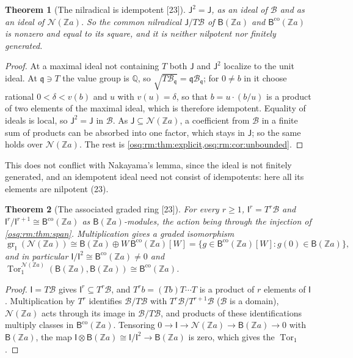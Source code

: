 \documentclass[11pt,letterpaper]{article}
\numberwithin{equation}{section}
\newtheorem{theorem}{Theorem}[section]
\theoremstyle{definition}
\theoremstyle{remark}
\theoremstyle{plain}
\newcommand{\Z}{\mathbb Z}
\newcommand{\Q}{\mathbb Q}
\newcommand{\NN}{\mathcal N}         %
\newcommand{\Tor}{\operatorname{Tor}}
\newcommand{\src}[1]{\textup{\textsf{[#1]}}}
\begin{document}
\begin{theorem}[The nilradical is idempotent \src{23}]\label{osq:rm:thm:nilideal}
$\mathsf J^2=\mathsf J$, as an ideal of $\mathscr B$ and as an ideal of $\NN(\Z a)$. So the common nilradical $\mathsf J/T\mathscr B$ of $\mathsf B(\Z a)$ and
$\mathsf B^{\mathrm{co}}(\Z a)$ is nonzero and equal to its square, and it is neither nilpotent nor finitely generated.
\end{theorem}
\begin{proof}
At a maximal ideal not containing $T$ both $\mathsf J$ and $\mathsf J^2$ localize to the unit ideal. At $\mathfrak q\ni T$ the value group is $\Q$, so
$\sqrt{T\mathscr B_{\mathfrak q}}=\mathfrak q\mathscr B_{\mathfrak q}$; for $0\ne b$ in it choose rational $0<\delta<v(b)$ and $u$ with $v(u)=\delta$, so that $b=u\cdot(b/u)$
is a product of two elements of the maximal ideal, which is therefore idempotent. Equality of ideals is local, so $\mathsf J^2=\mathsf J$ in $\mathscr B$.
As $\mathsf J\subseteq\NN(\Z a)$, a coefficient from $\mathscr B$ in a finite sum of products can be absorbed into one factor, which stays in $\mathsf J$; so the
same holds over $\NN(\Z a)$. The rest is \cref{osq:rm:thm:explicit,osq:rm:cor:unbounded}.
\end{proof}

This does not conflict with Nakayama's lemma, since the ideal is not finitely generated, and an idempotent ideal need not consist of idempotents:
here all its elements are nilpotent (23).

\begin{theorem}[The associated graded ring \src{23}]\label{osq:rm:thm:graded}
For every $r\ge1$, $\mathsf I^r=T^r\mathscr B$ and $\mathsf I^r/\mathsf I^{r+1}\cong\mathsf B^{\mathrm{co}}(\Z a)$ as $\mathsf B(\Z a)$-modules, the action being through the
injection of \cref{osq:rm:thm:span}. Multiplication gives a graded isomorphism
\begin{equation}\label{osq:rm:eq:graded}
 \operatorname{gr}_{\mathsf I}(\NN(\Z a))\cong\mathsf B(\Z a)\oplus W\,\mathsf B^{\mathrm{co}}(\Z a)[W]=\{g\in\mathsf B^{\mathrm{co}}(\Z a)[W]:g(0)\in\mathsf B(\Z a)\},
\end{equation}
and in particular $\mathsf I/\mathsf I^2\cong\mathsf B^{\mathrm{co}}(\Z a)\ne0$ and $\Tor_1^{\NN(\Z a)}(\mathsf B(\Z a),\mathsf B(\Z a))\cong\mathsf B^{\mathrm{co}}(\Z a)$.
\end{theorem}
\begin{proof}
$\mathsf I=T\mathscr B$ gives $\mathsf I^r\subseteq T^r\mathscr B$, and $T^rb=(Tb)T\cdots T$ is a product of $r$ elements of $\mathsf I$. Multiplication by $T^r$
identifies $\mathscr B/T\mathscr B$ with $T^r\mathscr B/T^{r+1}\mathscr B$ ($\mathscr B$ is a domain), $\NN(\Z a)$ acts through its image in $\mathscr B/T\mathscr B$, and products of
these identifications multiply classes in $\mathsf B^{\mathrm{co}}(\Z a)$. Tensoring $0\to\mathsf I\to\NN(\Z a)\to\mathsf B(\Z a)\to0$ with $\mathsf B(\Z a)$, the map
$\mathsf I\otimes\mathsf B(\Z a)\cong\mathsf I/\mathsf I^2\to\mathsf B(\Z a)$ is zero, which gives the $\Tor_1$.
\end{proof}
\end{document}
